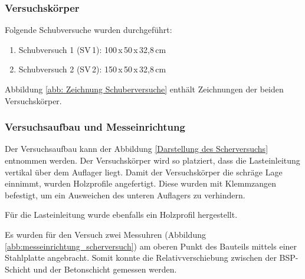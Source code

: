 \subsubsection{Versuchskörper}

Folgende Schubversuche wurden durchgeführt:

\begin{enumerate}
\item Schubversuch 1 (SV\,1): 100\,x\,50\,x\,32,8\,cm
\item Schubversuch 2 (SV\,2): 150\,x\,50\,x\,32,8\,cm
\end{enumerate}

Abbildung \ref{abb: Zeichnung Schuberversuche} enthält Zeichnungen der beiden Versuchskörper.

	
	
\subsubsection{Versuchsaufbau und Messeinrichtung}
 
Der Versuchsaufbau kann der Abbildung \ref{Darstellung des Scherversuchs} entnommen werden. Der Versuchskörper wird so platziert, dass die Lasteinleitung vertikal über dem Auflager liegt. Damit der Versuchskörper die schräge Lage einnimmt, wurden Holzprofile angefertigt. Diese wurden mit Klemmzangen befestigt, um ein Ausweichen des unteren Auflagers zu verhindern.

Für die Lasteinleitung wurde ebenfalls ein Holzprofil hergestellt.

Es wurden für den Versuch zwei Messuhren (Abbildung \ref{abb:messeinrichtung_scherversuch}) am oberen Punkt des Bauteils mittels einer Stahlplatte angebracht. Somit konnte die Relativverschiebung zwischen der BSP-Schicht und der Betonschicht gemessen werden.


